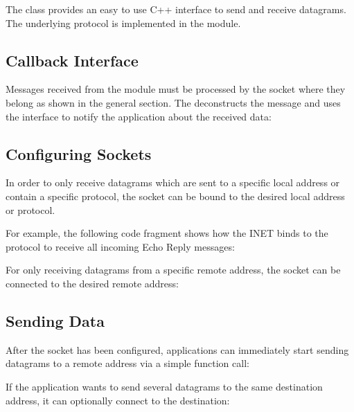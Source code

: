 The  class provides an easy to use C++ interface to send
and receive  datagrams. The underlying  protocol
is implemented in the  module.

\subsection*{Callback Interface}

Messages received from the  module must be processed by the socket
where they belong as shown in the general section. The 
deconstructs the message and uses the  interface
to notify the application about the received data:


\subsection*{Configuring Sockets}

In order to only receive  datagrams which are sent to a specific
local address or contain a specific protocol, the socket can be bound to the
desired local address or protocol.

For example, the following code fragment shows how the INET 
binds to the  protocol to receive all incoming
 Echo Reply messages:


For only receiving  datagrams from a specific remote address, the
socket can be connected to the desired remote address:


\subsection*{Sending Data}

After the socket has been configured, applications can immediately start sending
 datagrams to a remote address via a simple function call:


If the application wants to send several  datagrams to the same
destination address, it can optionally connect to the destination:

